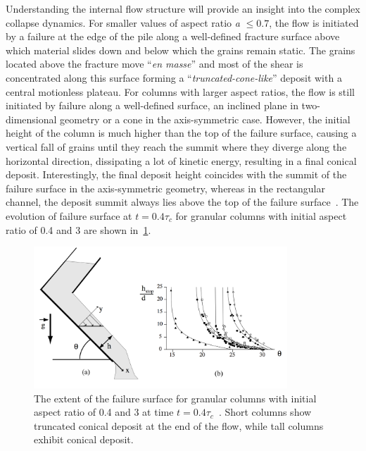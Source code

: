 Understanding the internal flow structure will provide an insight into the 
complex collapse dynamics. For smaller values of aspect ratio \textit{a} $\le 
0.7$, the flow is initiated by a failure at the edge of the pile along a 
well-defined fracture surface above which material slides down and below which 
the grains remain static. The grains located above the fracture move 
``\textit{en masse}'' and most of the shear is concentrated along this surface 
forming a ``\textit{truncated-cone-like}'' deposit with a central motionless 
plateau. For columns with larger aspect ratios, the flow is still initiated by 
failure along a well-defined surface, an inclined plane in two-dimensional 
geometry or a cone in the axis-symmetric case. However, the initial height of 
the column is much higher than the top of the failure surface, causing a 
vertical fall of grains until they reach the summit where they diverge along 
the horizontal direction, dissipating a lot of kinetic energy, resulting in a 
final conical deposit. Interestingly, the final deposit height coincides with 
the summit of the failure surface in the axis-symmetric geometry, whereas in 
the rectangular channel, the deposit summit always lies above the top of the 
failure surface~\citep{Lajeunesse2005}. The evolution of failure surface at $t 
= 0.4 \tau_c$ for granular columns with initial aspect ratio of 0.4 and 3 are 
shown in~\cref{fig:Deposit}.

\begin{figure}[tbhp]
\centering
\includegraphics[width=0.85\textwidth]{Deposit}
\caption{The extent of the failure surface for granular columns with initial 
aspect ratio of 0.4 and 3 at time $t= 0.4\tau_c$~\citep{Lajeunesse2004}. Short 
columns show truncated conical deposit at the end of the flow, while tall 
columns exhibit conical deposit.}
\label{fig:Deposit}
\end{figure}


